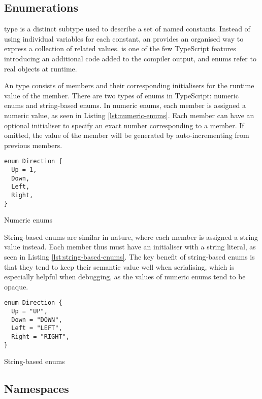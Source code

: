 \subsection{Enumerations}

 type is a distinct subtype used to describe a set of named constants. Instead of using individual variables for each constant, an  provides an organised way to express a collection of related values.  is one of the few TypeScript features introducing an additional code added to the compiler output, and enums refer to real objects at runtime.

An  type consists of members and their corresponding initialisers for the runtime value of the member. There are two types of enums in TypeScript: numeric enums and string-based enums. In numeric enums, each member is assigned a numeric value, as seen in Listing \ref{lst:numeric-enums}. Each member can have an optional initialiser to specify an exact number corresponding to a member. If omitted, the value of the member will be generated by auto-incrementing from previous members.

\begin{listing}[ht]
  \begin{verbatim}
enum Direction {
  Up = 1,
  Down,
  Left,
  Right,
}
\end{verbatim}
  \caption{Numeric enums}\label{lst:numeric-enums}
\end{listing}

String-based enums are similar in nature, where each member is assigned a string value instead. Each member thus must have an initialiser with a string literal, as seen in Listing \ref{lst:string-based-enums}. The key benefit of string-based enums is that they tend to keep their semantic value well when serialising, which is especially helpful when debugging, as the values of numeric enums tend to be opaque.

\begin{listing}[ht]
  \begin{verbatim}
enum Direction {
  Up = "UP",
  Down = "DOWN",
  Left = "LEFT",
  Right = "RIGHT",
}
\end{verbatim}
  \caption{String-based enums}\label{lst:string-based-enums}
\end{listing}

\subsection{Namespaces}

